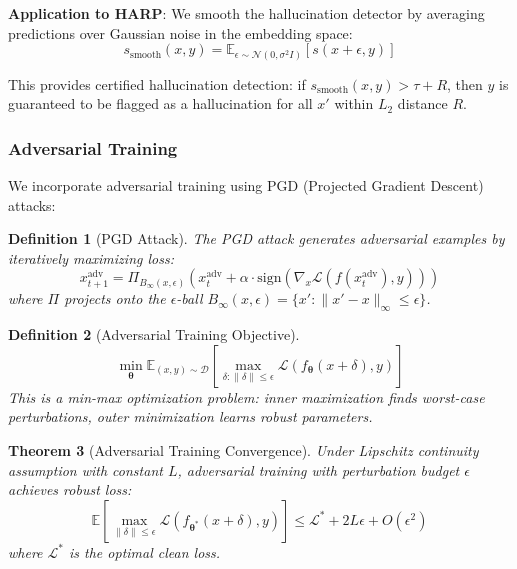 \documentclass[11pt,a4paper]{article}
\newtheorem{theorem}{Theorem}[section]
\newtheorem{definition}[theorem]{Definition}
\newcommand{\E}{\mathbb{E}}
\newcommand{\calL}{\mathcal{L}}
\newcommand{\calD}{\mathcal{D}}
\newcommand{\btheta}{\bm{\theta}}
\begin{document}
\textbf{Application to HARP}: We smooth the hallucination detector by averaging predictions over Gaussian noise in the embedding space:
\begin{equation}
    s_{\text{smooth}}(x, y) = \E_{\epsilon \sim \mathcal{N}(0, \sigma^2 I)}\left[s(x + \epsilon, y)\right]
\end{equation}

This provides certified hallucination detection: if $s_{\text{smooth}}(x, y) > \tau + R$, then $y$ is guaranteed to be flagged as a hallucination for all $x'$ within $L_2$ distance $R$.

\subsubsection{Adversarial Training}

We incorporate adversarial training using PGD (Projected Gradient Descent) attacks:

\begin{definition}[PGD Attack]
The PGD attack generates adversarial examples by iteratively maximizing loss:
\begin{equation}
    x_{t+1}^{\text{adv}} = \Pi_{B_\infty(x, \epsilon)}\left(x_t^{\text{adv}} + \alpha \cdot \text{sign}(\nabla_x \calL(f(x_t^{\text{adv}}), y))\right)
\end{equation}
where $\Pi$ projects onto the $\epsilon$-ball $B_\infty(x, \epsilon) = \{x' : \|x' - x\|_\infty \leq \epsilon\}$.
\end{definition}

\begin{definition}[Adversarial Training Objective]
\begin{equation}
    \min_\btheta \E_{(x,y) \sim \calD}\left[\max_{\delta: \|\delta\| \leq \epsilon} \calL(f_\btheta(x + \delta), y)\right]
\end{equation}
This is a min-max optimization problem: inner maximization finds worst-case perturbations, outer minimization learns robust parameters.
\end{definition}

\begin{theorem}[Adversarial Training Convergence]
\label{thm:harp_adv_training}
Under Lipschitz continuity assumption with constant $L$, adversarial training with perturbation budget $\epsilon$ achieves robust loss:
\begin{equation}
    \E\left[\max_{\|\delta\| \leq \epsilon} \calL(f_{\btheta^*}(x+\delta), y)\right] \leq \calL^* + 2L\epsilon + O(\epsilon^2)
\end{equation}
where $\calL^*$ is the optimal clean loss.
\end{theorem}
\end{document}
